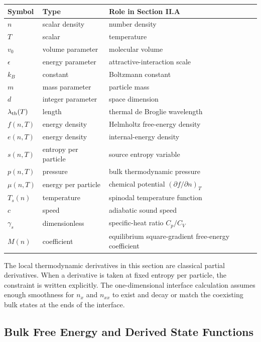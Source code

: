 \begin{center}
\begin{tabular}{@{}lll@{}}
\toprule
Symbol & Type & Role in Section II.A \\
\midrule
\(n\) & scalar density & number density \\
\(T\) & scalar & temperature \\
\(v_0\) & volume parameter & molecular volume \\
\(\epsilon\) & energy parameter & attractive-interaction scale \\
\(k_B\) & constant & Boltzmann constant \\
\(m\) & mass parameter & particle mass \\
\(d\) & integer parameter & space dimension \\
\(\lambda_{\rm th}(T)\) & length & thermal de Broglie wavelength \\
\(f(n,T)\) & energy density & Helmholtz free-energy density \\
\(e(n,T)\) & energy density & internal-energy density \\
\(s(n,T)\) & entropy per particle & source entropy variable \\
\(p(n,T)\) & pressure & bulk thermodynamic pressure \\
\(\mu(n,T)\) & energy per particle & chemical potential \((\partial f/\partial n)_T\) \\
\(T_s(n)\) & temperature & spinodal temperature function \\
\(c\) & speed & adiabatic sound speed \\
\(\gamma_s\) & dimensionless & specific-heat ratio \(C_p/C_V\) \\
\(M(n)\) & coefficient & equilibrium square-gradient free-energy coefficient \\
\bottomrule
\end{tabular}
\end{center}

The local thermodynamic derivatives in this section are classical partial
derivatives.  When a derivative is taken at fixed entropy per particle, the
constraint is written explicitly.  The one-dimensional interface calculation
assumes enough smoothness for \(n_x\) and \(n_{xx}\) to exist and decay or match
the coexisting bulk states at the ends of the interface.

\subsection{Bulk Free Energy and Derived State Functions}

